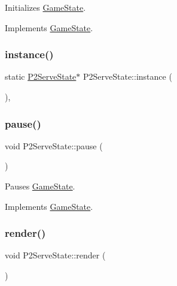 Initializes \mbox{\hyperlink{class_game_state}{Game\+State}}. 



Implements \mbox{\hyperlink{class_game_state_a10b6e6bb31591c70d08ffcee5f29fa81}{Game\+State}}.

\mbox{\label{class_p2_serve_state_ab33721553cd862745bb721fcab45b104}} 
\subsubsection{\texorpdfstring{instance()}{instance()}}
{\footnotesize\ttfamily static \mbox{\hyperlink{class_p2_serve_state}{P2\+Serve\+State}}$\ast$ P2\+Serve\+State\+::instance (\begin{DoxyParamCaption}{ }\end{DoxyParamCaption})\hspace{0.3cm}{\ttfamily [inline]}, {\ttfamily [static]}}

\mbox{\label{class_p2_serve_state_aa72fcf3306cf089d1efc7122a8147139}} 
\subsubsection{\texorpdfstring{pause()}{pause()}}
{\footnotesize\ttfamily void P2\+Serve\+State\+::pause (\begin{DoxyParamCaption}{ }\end{DoxyParamCaption})\hspace{0.3cm}{\ttfamily [virtual]}}



Pauses \mbox{\hyperlink{class_game_state}{Game\+State}}. 



Implements \mbox{\hyperlink{class_game_state_aafc908582760099891b37bb380ddd87a}{Game\+State}}.

\mbox{\label{class_p2_serve_state_acc6d131c7a5712a643b7f97c3bcdbd46}} 
\subsubsection{\texorpdfstring{render()}{render()}}
{\footnotesize\ttfamily void P2\+Serve\+State\+::render (\begin{DoxyParamCaption}\item[{\mbox{\hyperlink{class_game_engine}{Game\+Engine}} $\ast$}]{ }\end{DoxyParamCaption})\hspace{0.3cm}{\ttfamily [virtual]}}



